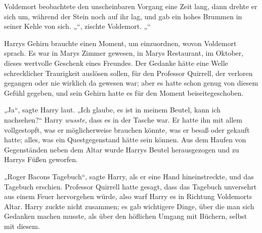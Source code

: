 Voldemort beobachtete den unscheinbaren Vorgang eine Zeit lang, dann drehte er sich um, während der Stein noch auf ihr lag, und gab ein hohes Brummen in seiner Kehle von sich.
„“, zischte Voldemort. „“

Harrys Gehirn brauchte einen Moment, um einzuordnen, wovon Voldemort sprach. Es war in Marys Zimmer gewesen, in Marys Restaurant, im Oktober, dieses wertvolle Geschenk eines Freundes. Der Gedanke hätte eine Welle schrecklicher Traurigkeit auslösen sollen, für den Professor Quirrell, der verloren gegangen oder nie wirklich da gewesen war; aber es hatte schon genug von diesem Gefühl gegeben, und sein Gehirn hatte es für den Moment beiseitegeschoben.

„Ja“, sagte Harry laut.
„Ich glaube, es ist in meinem Beutel, kann ich nachsehen?“
Harry \emph{wusste}, dass es in der Tasche war. Er hatte ihn mit allem vollgestopft, was er möglicherweise brauchen könnte, was er besaß oder gekauft hatte; alles, was ein Questgegenstand hätte sein können.
Aus dem Haufen von Gegenständen neben dem Altar wurde Harrys Beutel herausgezogen und zu Harrys Füßen geworfen.

„Roger Bacons Tagebuch“, sagte Harry, als er eine Hand hineinstreckte, und das Tagebuch erschien. Professor Quirrell hatte gesagt, dass das Tagebuch unversehrt aus einem Feuer hervorgehen würde, also warf Harry es in Richtung Voldemorts Altar. Harry zuckte nicht zusammen; es gab wichtigere Dinge, über die man sich Gedanken machen musste, als über den höflichen Umgang mit Büchern, selbst mit diesem.

